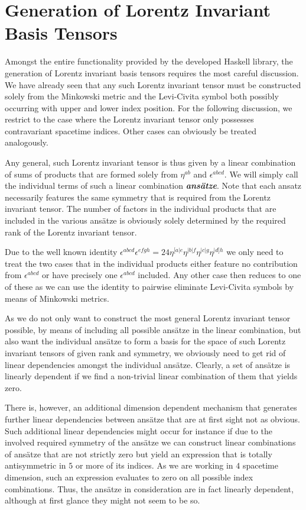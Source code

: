 \section{Generation of Lorentz Invariant Basis Tensors}\label{LorentzGen}
Amongst the entire functionality provided by the developed Haskell library, the generation of Lorentz invariant basis tensors requires the most careful discussion. We have already seen that any such Lorentz invariant tensor must be constructed solely from the Minkowski metric and the Levi-Civita symbol both possibly occurring with upper and lower index position. For the following discussion, we restrict to the case where the Lorentz invariant tensor only possesses contravariant spacetime indices. Other cases can obviously be treated analogously.

Any general, such Lorentz invariant tensor is thus given by a linear combination of sums of products that are formed solely from $\eta^{ab}$ and $\epsilon^{abcd}$.
We will simply call the individual terms of such a linear combination \textit{\textbf{ansätze}}. Note that each ansatz necessarily features the same symmetry that is required from the Lorentz invariant tensor. The number of factors in the individual products that are included in the various ansätze is obviously solely determined by the required rank of the Lorentz invariant tensor.

Due to the well known identity $\epsilon^{abcd}\epsilon^{efgh} = 24 \eta^{[a\vert e}\eta^{\vert b \vert f}\eta^{\vert c \vert g}\eta^{\vert d] h}$ we only need to treat the two cases that in the individual products either feature  no contribution from $\epsilon^{abcd}$ or have precisely one $\epsilon^{abcd}$ included. Any other case then reduces to one of these as we can use the identity to pairwise eliminate Levi-Civita symbols by means of Minkowski metrics. 

As we do not only want to construct the most general Lorentz invariant tensor possible, by means of including all possible ansätze in the linear combination, but also want the individual ansätze to form a basis for the space of such Lorentz invariant tensors of given rank and symmetry, we obviously need to get rid of linear dependencies amongst the individual ansätze. Clearly, a set of ansätze is linearly dependent if we find a non-trivial linear combination of them that yields zero. 

There is, however, an additional dimension dependent mechanism that generates further linear dependencies between ansätze that are at first sight not as obvious. Such additional linear dependencies might occur for instance if due to the involved required symmetry of the ansätze we can construct linear combinations of ansätze that are not strictly zero but yield an expression that is totally antisymmetric in $5$ or more of its indices. As we are working in $4$ spacetime dimension, such an expression evaluates to zero on all possible index combinations. Thus, the ansätze in consideration are in fact linearly dependent, although at first glance they might not seem to be so. 

